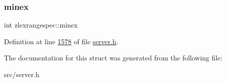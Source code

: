 \subsubsection{\texorpdfstring{minex}{minex}}
{\footnotesize\ttfamily int zlexrangespec\+::minex}



Definition at line \hyperlink{server_8h_source_l01578}{1578} of file \hyperlink{server_8h_source}{server.\+h}.



The documentation for this struct was generated from the following file\+:\begin{DoxyCompactItemize}
\item 
src/server.\+h\end{DoxyCompactItemize}
